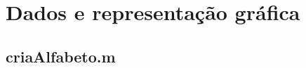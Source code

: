 \documentclass{article}
\begin{document}
\newpage

\section{Dados e representação gráfica}

\begin{comment}
Usando  as funções implementadas nos dois anteriores exercícios, criámos um script que:\\
- lê os ficheiros a analisar;\\
- determina o seu alfabeto através da funcão criaAlfabeto;\\
- o seu histograma de ocorrências;\\
- entropia.\\\\Por fim, apresenta a informação relevante, isto é, o histograma de ocorrências e o valor da entropia.
                    
Os alfabetos são determinados na função criaAlfabeto através de um switch que analisa a extensão do ficheiro e depois retorna o alfabeto correspondente.          
\end{comment}

\subsection{criaAlfabeto.m}

\begin{comment}
$\Rightarrow$ Para os ficheiros \textit{bmp} sabemos que o alfabeto reside entre 0 e 255, ($2^nbits$)-1, logo bastou criar uma matriz entre 0 e 255 com step de 1. \\
$\Rightarrow$ No ficheiro de texto o alfabeto assume-se ser composto por todas as letras do alfabeto romano sem assentos, pontuação e o caracter espaço.\\
$\Rightarrow$ Para o ficheiro \textit{wav}, através dos valores retornados pelo \textbf{wavread} (fonte e numero de bits para indexar o alfabeto (nbits)),  usando a função \textbf{linspace}, gera-se uma matriz do alfabeto de $2^nbits$ compreendida no  intervalo [-1,1[.\\\\
\end{comment}
\end{document}
